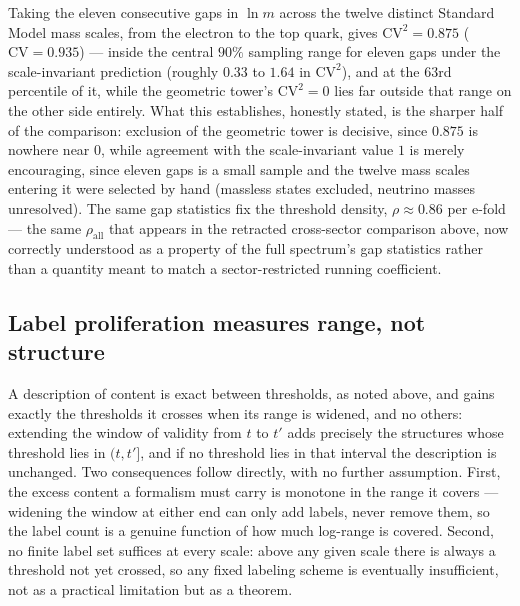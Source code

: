 \documentclass[aps,prd,twocolumn,superscriptaddress,nofootinbib]{revtex4-2}
\begin{document}
Taking the eleven consecutive gaps in $\ln m$ across the twelve distinct
Standard Model mass scales, from the electron to the top quark, gives
$\mathrm{CV}^2=0.875$ ($\mathrm{CV}=0.935$) — inside the central $90\%$
sampling range for eleven gaps under the scale-invariant prediction
(roughly $0.33$ to $1.64$ in $\mathrm{CV}^2$), and at the $63$rd
percentile of it, while the geometric tower's $\mathrm{CV}^2=0$ lies far
outside that range on the other side entirely. What this establishes,
honestly stated, is the sharper half of the comparison: exclusion of the
geometric tower is decisive, since $0.875$ is nowhere near $0$, while
agreement with the scale-invariant value $1$ is merely encouraging,
since eleven gaps is a small sample and the twelve mass scales entering
it were selected by hand (massless states excluded, neutrino masses
unresolved). The same gap statistics fix the threshold density,
$\rho\approx0.86$ per e-fold — the same $\rho_{\text{all}}$ that appears
in the retracted cross-sector comparison above, now correctly understood
as a property of the full spectrum's gap statistics rather than a
quantity meant to match a sector-restricted running coefficient.

\subsection{Label proliferation measures range, not structure}\label{ss:labelrange}

A description of content is exact between thresholds, as noted above,
and gains exactly the thresholds it
crosses when its range is widened, and no others: extending the window
of validity from $t$ to $t'$ adds precisely the structures whose
threshold lies in $(t,t']$, and if no threshold lies in that interval
the description is unchanged. Two consequences follow directly, with no
further assumption. First, the excess content a formalism must carry is
monotone in the range it covers — widening the window at either end can
only add labels, never remove them, so the label count is a genuine
function of how much log-range is covered. Second, no finite label set
suffices at every scale: above any given scale there is always a
threshold not yet crossed, so any fixed labeling scheme is eventually
insufficient, not as a practical limitation but as a theorem.
\end{document}
